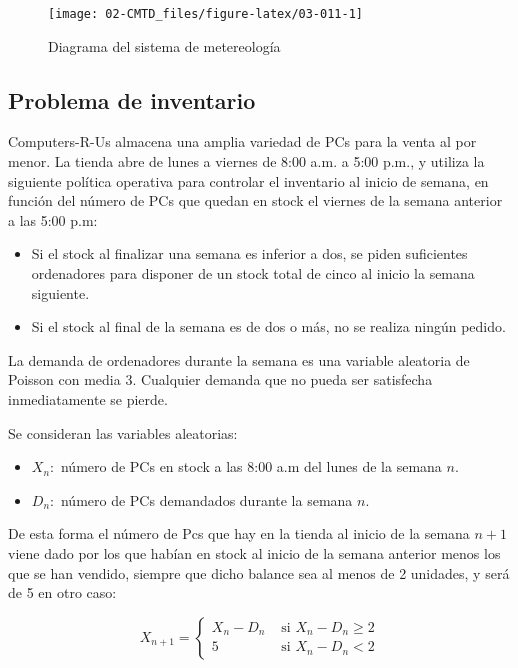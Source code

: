 \documentclass[
]{book}
\providecommand{\tightlist}{%
  \setlength{\itemsep}{0pt}\setlength{\parskip}{0pt}}
\theoremstyle{definition}
\theoremstyle{definition}
\theoremstyle{definition}
\theoremstyle{definition}
\theoremstyle{remark}
\begin{document}
\begin{figure}

{\centering \texttt{[image: 02-CMTD\_files/figure-latex/03-011-1]} 

}

\caption{Diagrama del sistema de metereología}\label{fig:03-011}
\end{figure}

\hypertarget{inventario}{%
\subsection{Problema de inventario}\label{inventario}}

Computers-R-Us almacena una amplia variedad de PCs para la venta al por menor. La tienda abre de lunes a viernes de 8:00 a.m. a 5:00 p.m., y utiliza la siguiente política operativa para controlar el inventario al inicio de semana, en función del número de PCs que quedan en stock el viernes de la semana anterior a las 5:00 p.m:

\begin{itemize}
\item
  Si el stock al finalizar una semana es inferior a dos, se piden suficientes ordenadores para disponer de un stock total de cinco al inicio la semana siguiente.
\item
  Si el stock al final de la semana es de dos o más, no se realiza ningún pedido.
\end{itemize}

La demanda de ordenadores durante la semana es una variable aleatoria de Poisson con media 3. Cualquier demanda que no pueda ser satisfecha inmediatamente se pierde.

Se consideran las variables aleatorias:

\begin{itemize}
\tightlist
\item
  \(X_n:\) número de PCs en stock a las 8:00 a.m del lunes de la semana \(n\).
\item
  \(D_n:\) número de PCs demandados durante la semana \(n\).
\end{itemize}

De esta forma el número de Pcs que hay en la tienda al inicio de la semana \(n+1\) viene dado por los que habían en stock al inicio de la semana anterior menos los que se han vendido, siempre que dicho balance sea al menos de 2 unidades, y será de 5 en otro caso:

\begin{equation*}
X_{n+1} = 
\begin{cases}
X_n - D_n & \text{ si } X_n - D_n \geq 2\\
5 & \text{ si } X_n - D_n < 2
\end{cases}
\end{equation*}
\end{document}
